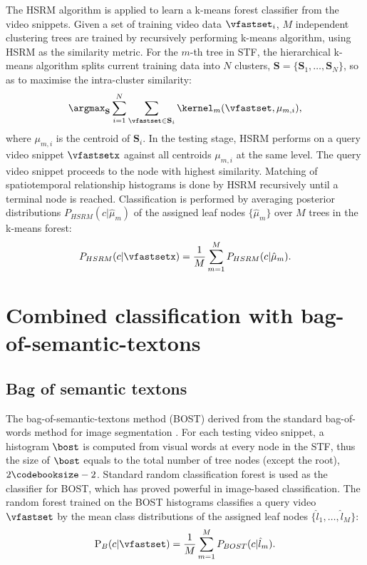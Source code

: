 The HSRM algorithm is applied to learn a k-means forest classifier from the video snippets. Given a set of training video data $\vfastset_i$, $M$ independent clustering trees are trained by recursively performing k-means algorithm, using HSRM as the similarity metric. 
For the $m$-th tree in STF, the hierarchical k-means algorithm splits current training data into $N$ clusters, $\mathbf{S} = \{\mathbf{S}_1,\dots,\mathbf{S}_N\}$, so as to maximise the intra-cluster similarity:
\begin{equation}
	\displaystyle\argmax_{\mathbf{S}} \displaystyle\sum_{i = 1}^{N}\sum_{\vfastset \in \mathbf{S}_{i}} \kernel_m(\vfastset, \mu_{m,i}),
	\label{eqn/act/kmeans}
\end{equation}
where $\mu_{m,i}$ is the centroid of $\mathbf{S}_i$. In the testing stage, HSRM performs on a query video snippet $\vfastsetx$ against all centroids $\mu_{m,i}$ at the same level. The query video snippet proceeds to the node with highest similarity. Matching of spatiotemporal relationship histograms is done by HSRM recursively until a terminal node is reached. Classification is performed by averaging posterior distributions $P_{HSRM}(c|\hat{\mu}_{m})$ of the assigned leaf nodes $\{ \hat{\mu}_m \}$ over $M$ trees in the k-means forest: 
\begin{equation}
	P_{HSRM}(c|\vfastsetx) = 
	\frac{1}{M}\displaystyle\sum_{m=1}^{M}P_{HSRM}(c|\hat{\mu}_{m}).
	\label{eqn/act/kmeansforest}
\end{equation}

\section{Combined classification with bag-of-semantic-textons}
\label{sec/act/combine}

\subsection{Bag of semantic textons}
The bag-of-semantic-textons method (BOST) derived from the standard bag-of-words method for image segmentation \cite{Shotton2008}. For each testing video snippet, a histogram $\bost$ is computed from visual words at every node in the STF, thus the size of $\bost$ equals to the total number of tree nodes (except the root), \ie $2\codebooksize - 2$.  
Standard random classification forest \cite{Breiman2001} is used as the classifier for BOST, which has proved powerful in image-based classification. 
The random forest trained on the BOST histograms classifies a query video $\vfastset$ by the mean class distributions of the assigned leaf nodes $\{\hat{l}_1,\dots,\hat{l}_{M}\}$:
\begin{equation}
\mathrm{P}_{B}(c|\vfastset) = \frac{1}{M}\displaystyle\sum_{m=1}^{M}P_{BOST}(c|\hat{l}_m).
\label{eqn/act/bost}
\end{equation}

